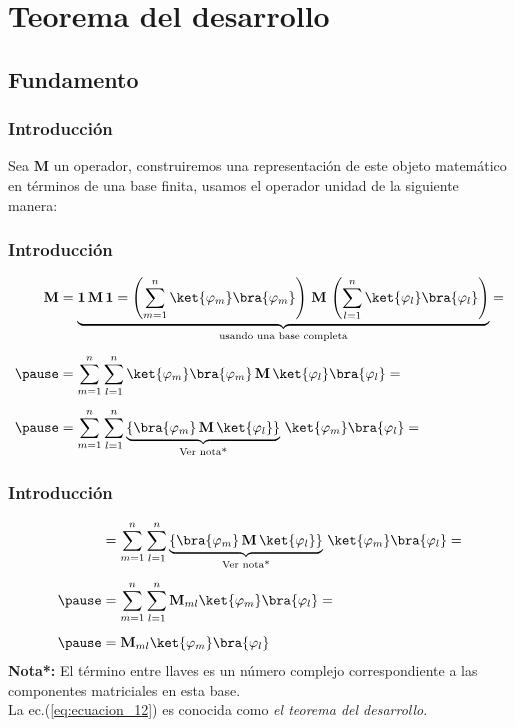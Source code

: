 \section{Teorema del desarrollo}
\subsection{Fundamento}
\begin{frame}
\frametitle{Introducción}
Sea $\mathbf{M}$ un operador, construiremos una representación de este objeto matemático en términos de una base finita, usamos el operador unidad de la siguiente manera:
\end{frame}
\begin{frame}
\frametitle{Introducción}
\fontsize{12}{12}\selectfont
\begin{eqnarray}
\begin{aligned}[b]
\mathbf{M} &= \underbrace{\mathbf{1 \, M \, 1} =  \left( \sum_{m=1}^{n} \ket{\varphi_{m}} \bra{\varphi_{m}} \right) \, \mathbf{M} \, \left( \sum_{l=1}^{n} \ket{\varphi_{l}} \bra{\varphi_{l}} \right)}_{\text{usando una base completa}} = \\[0.5em] \pause
&= \sum_{m=1}^{n} \sum_{l=1}^{n} \ket{\varphi_{m}} \bra{\varphi_{m}} \, \mathbf{M} \, \ket{\varphi_{l}} \bra{\varphi_{l}} = \\[0.5em] \pause
&= \sum_{m=1}^{n} \sum_{l=1}^{n} \underbrace{\left\{ \bra{\varphi_{m}} \, \mathbf{M} \, \ket{\varphi_{l}} \right\}}_{\text{Ver nota*}} \, \ket{\varphi_{m}} \bra{\varphi_{l}} =
\end{aligned}
\nonumber
\end{eqnarray}
\end{frame}
\begin{frame}
\frametitle{Introducción}
\fontsize{12}{12}\selectfont
\begin{eqnarray}
\begin{aligned}[b]
&= \sum_{m=1}^{n} \sum_{l=1}^{n} \underbrace{\left\{ \bra{\varphi_{m}} \, \mathbf{M} \, \ket{\varphi_{l}} \right\}}_{\text{Ver nota*}} \, \ket{\varphi_{m}} \bra{\varphi_{l}} = \\[0.5em] \pause
&= \sum_{m=1}^{n} \sum_{l=1}^{n} \mathbf{M}_{ml} \ket{\varphi_{m}} \bra{\varphi_{l}} = \\[0.5em] \pause
&= \mathbf{M}_{ml} \ket{\varphi_{m}} \bra{\varphi_{l}}
\end{aligned}
\label{eq:ecuacion_12}
\end{eqnarray}
\textbf{Nota*: } El término entre llaves es un número complejo correspondiente a las componentes matriciales en esta base.
\\
\bigskip
\pause
La ec.(\ref{eq:ecuacion_12}) es conocida como \emph{el teorema del desarrollo}.
\end{frame}
